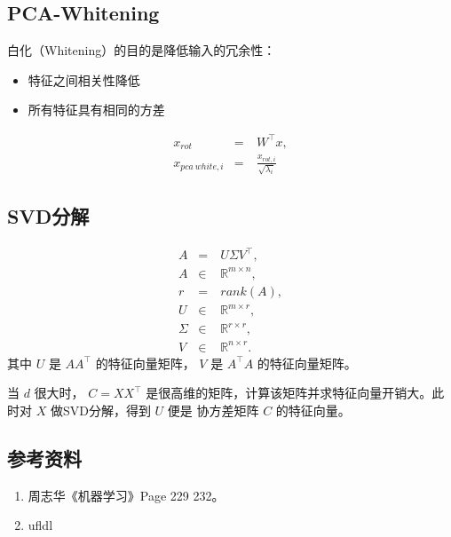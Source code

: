 \documentclass[letterpaper,10pt,english]{sphinxmanual}
\begin{document}
\subsection{PCA-Whitening}
\label{\detokenize{machineLearning/03_pca:pca-whitening}}
白化（Whitening）的目的是降低输入的冗余性：
\begin{itemize}
\item {} 
特征之间相关性降低

\item {} 
所有特征具有相同的方差

\end{itemize}
\begin{equation*}
\begin{split}x_{rot} & = &\  W^{\top} x, \\
x_{pca\ white, i} & = &\  \frac{x_{rot, i}}{\sqrt{\lambda_i}}\end{split}
\end{equation*}

\subsection{SVD分解}
\label{\detokenize{machineLearning/03_pca:svd}}\begin{equation*}
\begin{split}A & = &\ U \Sigma V^{\top},\\
A & \in &\ \mathbb{R}^{m \times n}, \\
r & = &\ rank(A),\\
U & \in &\ \mathbb{R}^{m \times r}, \\
\Sigma & \in &\ \mathbb{R}^{r \times r}, \\
V & \in &\ \mathbb{R}^{n \times r}.\end{split}
\end{equation*}
其中 \(U\) 是 \(AA^{\top}\) 的特征向量矩阵， \(V\) 是 \(A^{\top}A\) 的特征向量矩阵。

当 \(d\) 很大时， \(C=XX^{\top}\) 是很高维的矩阵，计算该矩阵并求特征向量开销大。此时对 \(X\) 做SVD分解，得到 \(U\) 便是
协方差矩阵 \(C\) 的特征向量。


\subsection{参考资料}
\label{\detokenize{machineLearning/03_pca:id4}}\begin{enumerate}
\item {} 
周志华《机器学习》Page 229 \textendash{} 232。

\item {} 
ufldl

\end{enumerate}
\begin{quote}

\end{quote}
\end{document}
